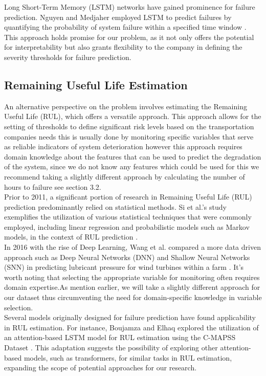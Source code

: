 \documentclass{article}
\begin{document}
Long Short-Term Memory (LSTM) networks have gained prominence for failure prediction. Nguyen and Medjaher employed LSTM to predict failures by quantifying the probability of system failure within a specified time window \cite{nguyen2019}. This approach holds promise for our problem, as it not only offers the potential for interpretability but also grants flexibility to the company in defining the severity thresholds for failure prediction.

\subsection{Remaining Useful Life Estimation}

An alternative perspective on the problem involves estimating the Remaining Useful Life (RUL), which offers a versatile approach. This approach allows for the setting of thresholds to define significant risk levels based on the transportation companies needs this is usually done by monitoring specific variables that serve as reliable indicators of system deterioration however this approach requires domain knowledge about the features that can be used to predict the degradation of the system, since we do not know any features which could be used for this we recommend taking a slightly different approach by calculating the number of hours to failure see section 3.2. \\

Prior to 2011, a significant portion of research in Remaining Useful Life (RUL) prediction predominantly relied on statistical methods. Si et al.'s study exemplifies the utilization of various statistical techniques that were commonly employed, including linear regression and probabilistic models such as Markov models, in the context of RUL prediction \cite{SI2011}. \\

In 2016 with the rise of Deep Learning, Wang et al. compared a more data driven approach such as Deep Neural Networks (DNN) and Shallow Neural Networks (SNN) in predicting lubricant pressure for wind turbines within a farm \cite{wang2016}. It's worth noting that selecting the appropriate variable for monitoring often requires domain expertise.As mention earlier, we will take a slightly different approach for our dataset thus circumventing the need for domain-specific knowledge in variable selection. \\

Several models originally designed for failure prediction have found applicability in RUL estimation. For instance, Boujamza and Elhaq explored the utilization of an attention-based LSTM model for RUL estimation using the C-MAPSS Dataset \cite{Boujamza2022}. This adaptation suggests the possibility of exploring other attention-based models, such as transformers, for similar tasks in RUL estimation, expanding the scope of potential approaches for our research.\\
\end{document}
